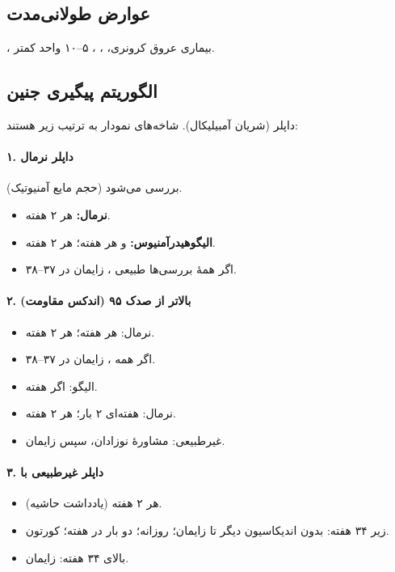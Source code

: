 \documentclass[12pt,a4paper]{article}
\begin{document}
\subsection*{عوارض طولانی‌مدت }
، بیماری عروق کرونری، ، ، ۵–۱۰ واحد کمتر.

\subsection*{الگوریتم پیگیری جنین }

داپلر  (شریان آمبیلیکال). شاخه‌های نمودار به ترتیب زیر هستند:

\paragraph{۱. داپلر نرمال}
 (حجم مایع آمنیوتیک) بررسی می‌شود.
\begin{itemize}
\item \textbf{ نرمال:}  هر ۲ هفته.
\item \textbf{الیگوهیدرآمنیوس:}  و  هر هفته؛  هر ۲ هفته.
\item اگر همهٔ بررسی‌ها طبیعی ، زایمان در ۳۷–۳۸.
\end{itemize}

\paragraph{۲.  (اندکس مقاومت) بالاتر از صدک ۹۵}
\begin{itemize}
\item {} نرمال:  هر هفته؛  هر ۲ هفته.
\item اگر همه ، زایمان در ۳۷–۳۸.
\item الیگو:  اگر  هفته.
\item {} نرمال:  هفته‌ای ۲ بار؛  هر ۲ هفته.
\item {} غیرطبیعی: مشاورهٔ نوزادان، سپس زایمان.
\end{itemize}

\paragraph{۳. داپلر غیرطبیعی با }
\begin{itemize}
\item {} هر ۲ هفته (یادداشت حاشیه).
\item {} زیر ۳۴ هفته: بدون اندیکاسیون دیگر تا زایمان؛  روزانه؛  دو بار در هفته؛ کورتون.
\item بالای ۳۴ هفته: زایمان.
\end{itemize}
\end{document}
